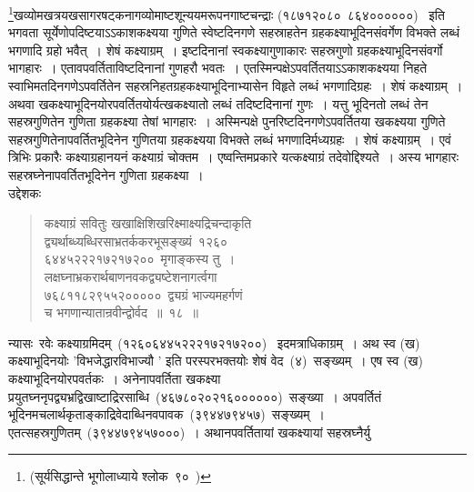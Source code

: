 \documentclass[11pt, openany]{book}
\begin{document}
\indent
\renewcommand\thefootnote{*}\footnote{(सूर्यसिद्धान्ते भूगोलाध्याये श्लोक~९०~)}खव्योमखत्रयखसागरषट्कनागव्योमाष्टशून्ययमरूपनगाष्टचन्द्राः (१८७१२०८०\textendash\ ८६४००००००) ~इति भगवता सूर्येणोपदिष्टयाऽऽकाशकक्ष्यया गुणिते स्वेष्टदिनगणे सहस्राहतेन ग्रहकक्ष्याभूदिनसंवर्गेण विभक्ते लब्धं भगणादि ग्रहो भवैत्~। शेषं कक्ष्याग्रम्~। इष्टदिनानां स्वकक्ष्यागुणाकारः सहस्रगुणो ग्रहकक्ष्याभूदिनसंवर्गो भागहारः~। एतावपवर्तिताविष्टदिनानां गुणहरौ भवतः~। एतस्मिन्पक्षेऽपवर्तितयाऽऽकाशकक्ष्यया निहते स्वाभिमतदिनगणेऽपवर्तितेन
सहस्रनिहतग्रहकक्ष्याभूदिनाभ्यासेन विहृते लब्धं भगणादिग्रहः~। शेषं कक्ष्याग्रम्~। अथवा
खकक्ष्याभूदिनयोरपवर्तितयोर्यत्खकक्ष्यातो लब्धं तदिष्टदिनानां गुणः~। यत्तु भूदिनतो लब्धं तेन सहस्रगुणितेन गुणिता ग्रहकक्ष्या तेषां भागहारः~। अस्मिन्पक्षे पुनरिष्टदिनगणेऽपवर्तितया खकक्ष्यया गुणिते सहस्रगुणितेनापवर्तितभूदिनेन गुणितया ग्रहकक्ष्यया विभक्ते लब्धं भगणादिर्मध्यग्रहः~। शेषं कक्ष्याग्रम्~। एवं त्रिभिः प्रकारैः कक्ष्याग्रहानयनं कक्ष्याग्रं चोक्तम~। एष्वन्तिमप्रकारे यत्कक्ष्याग्रं तदेवोद्दिश्यते~। अस्य भागहारः सहस्रघ्नेनापवर्तितभूदिनेन गुणिता ग्रहकक्ष्या~। \\

उद्देशकः \textendash
\begin{quote}
{\ku कक्ष्याग्रं सवितुः खखाक्षिशिखरिक्ष्माक्ष्यद्रिचन्दाकृति\\
द्व्यर्थाब्ध्यब्धिरसाभ्रतर्ककरभूसङ्ख्यं~१२६०\textendash\\
६४४५२२२१७२१७२००~मृगाङ्कस्य तु~।\\
लक्षघ्नाभ्रकरार्थबाणनवकद्व्यष्टेशनागर्त्वगा\\
७६८११८२९५५२०००००~द्व्यग्रं भाज्यमहर्गणं\\
च भगणान्यातान्रवीन्द्वोर्वद~॥~१८~॥}
\end{quote}

\indent
न्यासः\textendash\ रवेः कक्ष्याग्रमिदम्~(१२६०६४४५२२२१७२१७२००)~ इदमत्राधिकाग्रम्~। अथ स्व (ख) कक्ष्याभूदिनयोः 'विभजेद्धारविभाज्यौ ' इति परस्परभक्तयोः शेषं वेद~(४)~सङ्ख्यम्~। एष स्व (ख) कक्ष्याभूदिनयोरपवर्तकः~। अनेनापवर्तिता खकक्ष्या प्रयुतघ्ननृपद्व्यभ्रद्विखाष्टाद्रिरसाब्धि~(४६७८०२०२१६००००००)~सङ्ख्या~। अपवर्तितं भूदिनमचलार्थकृताङ्काद्रिवेदाब्धिनवपावक~(३९४४७९४५७)~सङ्ख्यम्~।एतत्सहस्रगुणितम्~(३९४४७९४५७०००)~। अथानपवर्तितायां खकक्ष्यायां सहस्रघ्नैर्यु\textendash


\newpage
\thispagestyle{fancy}
\fancyhf{}
\end{document}
